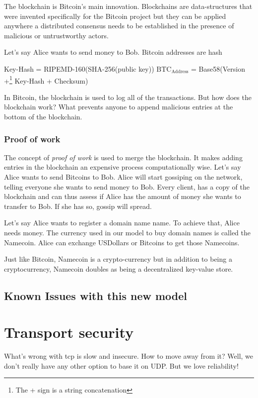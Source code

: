 \documentclass{vldb}
\begin{document}
The blockchain is Bitcoin's main innovation. Blockchains are data-structures that were invented specifically for the Bitcoin project but they can be applied anywhere a distributed consensus needs to be established in the presence of malicious or untrustworthy actors.

Let's say Alice wants to send money to Bob. Bitcoin addresses are hash
\begin{center}
Key-Hash = RIPEMD-160(SHA-256(public key))
$\text{BTC}_{\text{Address}}$ = Base58(Version +\footnote{The + sign is a string concatenation} Key-Hash + Checksum)
\end{center}
In Bitcoin, the blockchain is used to log all of the transactions. But how does the blockchain work? What prevents anyone to append malicious entries at the bottom of the blockchain.



\subsubsection{Proof of work}

The concept of \emph{proof of work} is used to merge the blockchain. It makes adding entries in the blockchain an expensive process computationally wise. Let's say Alice wants to send Bitcoins to Bob. Alice will start gossiping on the network, telling everyone she wants to send money to Bob. Every client, has a copy of the blockchain and can thus assess if Alice has the amount of money she wants to transfer to Bob. If she has so, gossip will spread. 

Let's say Alice wants to register a domain name name. To achieve that, Alice needs money. The currency used in our model to buy domain names is called the Namecoin. Alice can exchange USDollars or Bitcoins to get those Namecoins. 

Just like Bitcoin, Namecoin is a crypto-currency but in addition to being a cryptocurrency, Namecoin doubles as being a decentralized key-value store.


\subsection{Known Issues with this new model}

\section{Transport security}
What's wrong with tcp is slow and insecure. How to move away from it? Well, we don't really have any other option to base it on UDP.
But we love reliability!
\end{document}
